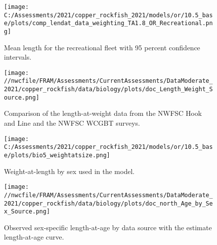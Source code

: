\documentclass[11pt,
  english,
  a4paper,
]{article}
\begin{document}
\tagmcend\tagstructend


\begin{figure}
\centering
\texttt{[image: C:/Assessments/2021/copper\_rockfish\_2021/models/or/10.5\_base/plots/comp\_lendat\_data\_weighting\_TA1.8\_OR\_Recreational.png]}
\caption{Mean length for the recreational fleet with 95 percent confidence intervals.\label{fig:mean-rec-len-data}}
\end{figure}

\tagmcend\tagstructend


\begin{figure}
\centering
\texttt{[image: //nwcfile/FRAM/Assessments/CurrentAssessments/DataModerate\_2021/copper\_rockfish/data/biology/plots/doc\_Length\_Weight\_Source.png]}
\caption{Comparison of the length-at-weight data from the NWFSC Hook and Line and the NWFSC WCGBT surveys.\label{fig:len-weight-survey}}
\end{figure}

\tagmcend\tagstructend


\begin{figure}
\centering
\texttt{[image: C:/Assessments/2021/copper\_rockfish\_2021/models/or/10.5\_base/plots/bio5\_weightatsize.png]}
\caption{Weight-at-length by sex used in the model.\label{fig:len-weight}}
\end{figure}

\tagmcend\tagstructend


\begin{figure}
\centering
\texttt{[image: //nwcfile/FRAM/Assessments/CurrentAssessments/DataModerate\_2021/copper\_rockfish/data/biology/plots/doc\_north\_Age\_by\_Sex\_Source.png]}
\caption{Observed sex-specific length-at-age by data source with the estimate length-at-age curve.\label{fig:len-age-data}}
\end{figure}

\tagmcend\tagstructend

\end{document}
